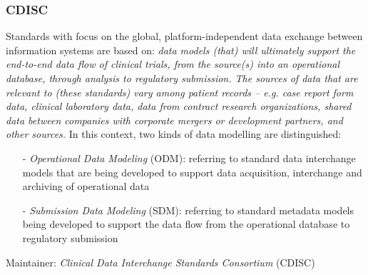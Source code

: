 %
%
%
%
%
%
%

\subsubsection{CDISC}
\label{cdisc_heading}

Standards with focus on the global, platform-independent data exchange between
information systems are based on: \textit{data models (that) will ultimately
support the end-to-end data flow of clinical trials, from the source(s) into an
operational database, through analysis to regulatory submission. The sources of
data that are relevant to (these standards) vary among patient records -- e.g.
case report form data, clinical laboratory data, data from contract research
organizations, shared data between companies with corporate mergers or
development partners, and other sources.} \cite{cdisc} In this context, two
kinds of data modelling are distinguished:

\begin{itemize}
    \item[-] \emph{Operational Data Modeling} (ODM): referring to standard data
        interchange models that are being developed to support data acquisition,
        interchange and archiving of operational data
    \item[-] \emph{Submission Data Modeling} (SDM): referring to standard
        metadata models being developed to support the data flow from the
        operational database to regulatory submission
\end{itemize}

Maintainer: \emph{Clinical Data Interchange Standards Consortium} (CDISC)

